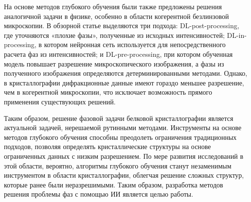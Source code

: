 На основе методов глубокого обучения были также предложены решения аналогичной задачи в физике, особенно в области когерентной безлинзовой микроскопии. В обзорной статье \cite{review_physics} выделяются три подхода: DL-post-processing, где уточняются «плохие фазы», полученные из исходных интенсивностей; DL-in-processing, в котором нейронная сеть используется для непосредственного расчета фаз из интенсивностей; и DL-pre-processing, при котором обученная модель повышает разрешение микроскопического изображения, а фазы из полученного изображения определяются детерминированными методами. Однако, в кристаллографии дифракционные данные имеют гораздо меньшее разрешение, чем в когерентной микроскопии, что исключает возможность прямого применения существующих решений.

Таким образом, решение фазовой задачи белковой кристаллографии является актуальной задачей, нерешаемой рутинными методами. Инструменты на основе методов глубокого обучения способны преодолеть ограничения традиционных подходов, позволяя определять кристаллические структуры на основе ограниченных данных с низким разрешением. По мере развития исследований в этой области, вероятно, алгоритмы глубокого обучения станут незаменимым инструментом в области кристаллографии, облегчая решение сложных структур, которые ранее были неразрешимыми. Таким образом, разработка методов решения проблемы фаз с помощью ИИ является целью работы. 